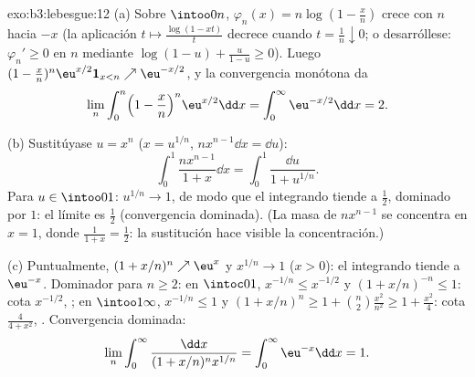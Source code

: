 \begin{solution}{exo:b3:lebesgue:12}
(a) Sobre $\intoo0n$, $\varphi_n(x) = n\log(1 - \frac xn)$ crece con $n$
hacia $-x$ (la aplicación $t \mapsto
\frac{\log(1 - xt)}{t}$ decrece cuando $t = \frac1n
\downarrow 0$; o desarróllese: $\varphi_{n}' \geq 0$ en $n$ mediante
$\log(1-u) + \frac{u}{1-u} \geq 0$). Luego $(1 -
\frac xn)^n\eu^{x/2}\mathbf 1_{x<n} \nearrow
\eu^{-x/2}$, y la convergencia monótona da
\[
\lim_n\int_0^n\Bigl(1 - \frac xn\Bigr)^n\eu^{x/2}\dd x =
\int_0^\infty\eu^{-x/2}\dd x = 2 .
\]

(b) Sustitúyase $u = x^n$ ($x = u^{1/n}$, $n x^{n-1}\dd x =
\dd u$):
\[
\int_0^1\frac{nx^{n-1}}{1 + x}\dd x =
\int_0^1\frac{\dd u}{1 + u^{1/n}} .
\]
Para $u \in \intoo01$: $u^{1/n} \to 1$, de modo que el integrando tiende
a $\frac12$, dominado por $1$: el límite es $\frac12$ (convergencia
dominada). (La masa de $nx^{n-1}$ se concentra en $x
= 1$, donde $\frac1{1+x} = \frac12$: la sustitución hace visible la
concentración.)

(c) Puntualmente, $(1 + x/n)^n \nearrow \eu^x$ y $x^{1/n} \to
1$ ($x > 0$): el integrando tiende a $\eu^{-x}$. Dominador para
$n \geq 2$: en $\intoc01$, $x^{-1/n} \leq x^{-1/2}$ y
$(1 + x/n)^{-n} \leq 1$: cota $x^{-1/2}$,
; en $\intoo1\infty$,
$x^{-1/n} \leq 1$ y $(1 + x/n)^n \geq 1 +
\binom n2\frac{x^2}{n^2} \geq 1 + \frac{x^2}4$: cota
$\frac{4}{4 + x^2}$, .
Convergencia dominada:
\[
\lim_n\int_0^\infty\frac{\dd x}{(1 + x/n)^nx^{1/n}} =
\int_0^\infty\eu^{-x}\dd x = 1 .
\]
\end{solution}

